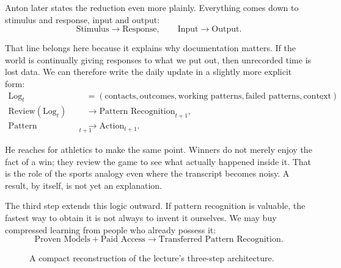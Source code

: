 Anton later states the reduction even more plainly. Everything comes down to stimulus and response, input and output:
\begin{equation}
\text{Stimulus} \to \text{Response}, \qquad \text{Input} \to \text{Output}.
\end{equation}

That line belongs here because it explains why documentation matters. If the world is continually giving responses to what we put out, then unrecorded time is lost data. We can therefore write the daily update in a slightly more explicit form:
\begin{align}
\text{Log}_t &= (\text{contacts},\text{outcomes},\text{working patterns},\text{failed patterns},\text{context}),\\
\text{Review}(\text{Log}_t) &\to \text{Pattern Recognition}_{t+1},\\
\text{Pattern Recognition}_{t+1} &\to \text{Action}_{t+1}.
\end{align}

He reaches for athletics to make the same point. Winners do not merely enjoy the fact of a win; they review the game to see what actually happened inside it. That is the role of the sports analogy even where the transcript becomes noisy. A result, by itself, is not yet an explanation.

The third step extends this logic outward. If pattern recognition is valuable, the fastest way to obtain it is not always to invent it ourselves. We may buy compressed learning from people who already possess it:
\begin{equation}
\text{Proven Models} + \text{Paid Access} \to \text{Transferred Pattern Recognition}.
\end{equation}

\begin{figure}[ht]
\centering
{}
\caption{A compact reconstruction of the lecture's three-step architecture.}
\end{figure}

